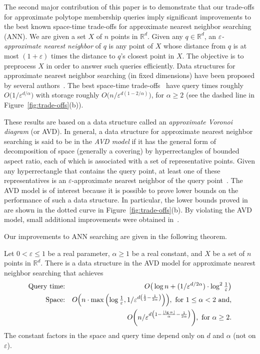 \documentclass[11pt]{article}   \usepackage[letterpaper,hmargin=2.1cm,vmargin=3cm]{geometry}
\newcommand{\floor}[1]{\left\lfloor #1\right\rfloor}
\newcommand{\RE}{\mathbb{R}}    \newcommand{\ZZ}{\mathbb{Z}}    \newcommand{\eps}{\varepsilon}  \newcommand{\ST}{\,:\,}         \newcommand{\sq}{\square}
\newcommand{\OO}[1]{O\kern-2pt\left(#1\right)}  \newcommand{\half}[1]{\frac{#1}{2}}
\newcommand{\inv}[1]{\frac{1}{#1}}
\begin{document}
The second major contribution of this paper is to demonstrate that our trade-offs for approximate polytope membership queries imply significant improvements to the best known space-time trade-offs for approximate nearest neighbor searching (ANN). We are given a set $X$ of $n$ points in $\RE^d$. Given any $q \in \RE^d$, an \emph{$\eps$-approximate nearest neighbor} of $q$ is any point of $X$ whose distance from $q$ is at most $(1+\eps)$ times the distance to $q$'s closest point in $X$. The objective is to preprocess $X$ in order to answer such queries efficiently. Data structures for approximate nearest neighbor searching (in fixed dimensions) have been proposed by several authors~\cite{Chan-ANN02, DGK01, HP-AVD, Clarkson-ANN, SSS06}. The best space-time trade-offs~\cite{AVD-JACM} have query times roughly $O\big(1/\eps^{d/\alpha}\big)$ with storage roughly $O\big(n/\eps^{d(1-2/\alpha)}\big)$, for $\alpha \geq 2$ (see the dashed line in Figure~\ref{fig:trade-offs}(b)). 

These results are based on a data structure called an \emph{approximate Voronoi diagram} (or AVD). In general, a data structure for approximate nearest neighbor searching is said to be in the \emph{AVD model} if it has the general form of decomposition of space (generally a covering) by hyperrectangles of bounded aspect ratio, each of which is associated with a set of representative points. Given any hyperrectangle that contains the query point, at least one of these representatives is an $\eps$-approximate nearest neighbor of the query point~\cite{AVD-JACM}. The AVD model is of interest because it is possible to prove lower bounds on the performance of such a data structure. In particular, the lower bounds proved in \cite{AVD-JACM} are shown in the dotted curve in Figure~\ref{fig:trade-offs}(b). By violating the AVD model, small additional improvements were obtained in~\cite{proximity}.

Our improvements to ANN searching are given in the following theorem.

\begin{theorem} \label{thm:ann-ub}
Let $0 < \eps \leq 1$ be a real parameter, $\alpha \geq 1$ be a real constant, and $X$ be a set of $n$ points in $\RE^d$. There is a data structure in the AVD model for approximate nearest neighbor searching that achieves
\begin{eqnarray*}
\text{Query time:} & & O\big(\log n + (1/\eps^{d/2 \alpha}) \cdot  {\textstyle \log^2 \inv{\eps}}\big) \\
\text{Space:} & & 
  \OO{n \cdot \max\left({\textstyle \log \inv{\eps}}, 1/\eps^{d\left(\inv{2} -\inv{2\alpha}\right)}\right)}\kern-2pt , \text{~for $1 \leq \alpha < 2$ and,} \\
  & &
  \OO{n/\eps^{d \left(1 - \frac{\floor{\lg\alpha}}{\alpha} - \inv{2 \alpha}\right)}}\kern-2pt , \text{~for $\alpha \geq 2$}.
\end{eqnarray*}
The constant factors in the space and query time depend only on $d$ and $\alpha$ (not on $\eps$). 
\end{theorem}
\end{document}
